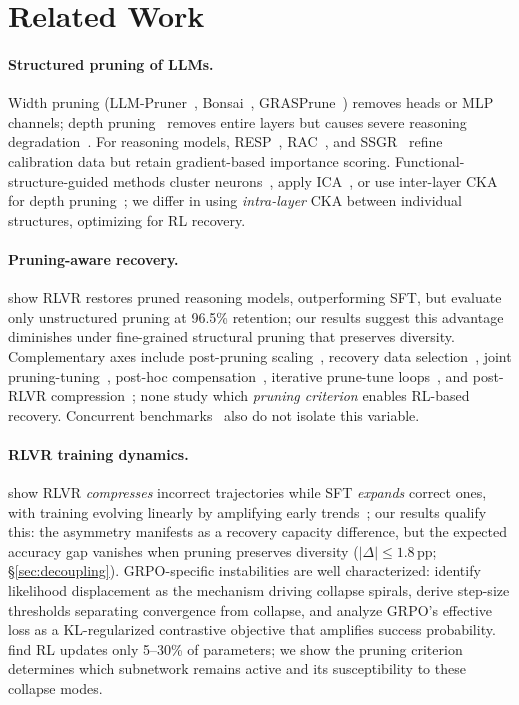 \section{Related Work}
\label{sec:related}

\paragraph{Structured pruning of LLMs.}
Width pruning (LLM-Pruner~\citep{llmpruner2023}, Bonsai~\citep{bonsai2025}, GRASPrune~\citep{graspprune2026}) removes heads or MLP channels; depth pruning~\citep{shortgpt2024,slicegpt2024} removes entire layers but causes severe reasoning degradation~\citep{shrestha2026layerpruninglimits,llms2lrms2026}.
For reasoning models, RESP~\citep{resp2025}, RAC~\citep{rac2025}, and SSGR~\citep{ssgr2025} refine calibration data but retain gradient-based importance scoring.
Functional-structure-guided methods cluster neurons~\citep{fang_2025}, apply ICA~\citep{funcnet_2025}, or use inter-layer CKA for depth pruning~\citep{mpruner2024,kornblith2019cka}; we differ in using \emph{intra-layer} CKA between individual structures, optimizing for RL recovery.

\paragraph{Pruning-aware recovery.}
\citet{selfhealing2025} show RLVR restores pruned reasoning models, outperforming SFT, but evaluate only unstructured pruning at 96.5\% retention; our results suggest this advantage diminishes under fine-grained structural pruning that preserves diversity.
Complementary axes include post-pruning scaling~\citep{p2law2025}, recovery data selection~\citep{paser2025}, joint pruning-tuning~\citep{pat2025}, post-hoc compensation~\citep{restorelcc_2025}, iterative prune-tune loops~\citep{boiling_frog_2026}, and post-RLVR compression~\citep{opsd2026}; none study which \emph{pruning criterion} enables RL-based recovery.
Concurrent benchmarks~\citep{li2025reasoning_compression,canpruning2025} also do not isolate this variable.

\paragraph{RLVR training dynamics.}
\citet{rlsqueezes2026} show RLVR \emph{compresses} incorrect trajectories while SFT \emph{expands} correct ones, with training evolving linearly by amplifying early trends~\citep{wang2026linearity}; our results qualify this: the asymmetry manifests as a recovery capacity difference, but the expected accuracy gap vanishes when pruning preserves diversity ($|\Delta| \leq 1.8$\,pp; \S\ref{sec:decoupling}).
GRPO-specific instabilities are well characterized: \citet{deng2025grpocollapse} identify likelihood displacement as the mechanism driving collapse spirals, \citet{suk2025rlvrdynamics} derive step-size thresholds separating convergence from collapse, and \citet{mroueh2025grpodynamics} analyze GRPO's effective loss as a KL-regularized contrastive objective that amplifies success probability.
\citet{mukherjee2025rlsubnetworks} find RL updates only 5--30\% of parameters; we show the pruning criterion determines which subnetwork remains active and its susceptibility to these collapse modes.
